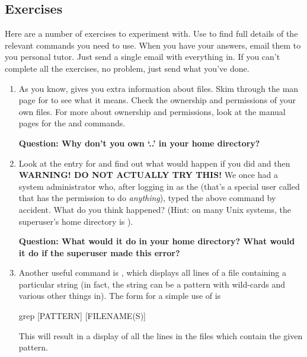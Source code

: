 \subsection{Exercises}

Here are a number of exercises to experiment with. Use 
to find full details of the relevant commands you need to use. When you
have your answers, email them to you personal tutor. Just send a
single email with everything in. If you can't complete all the
exercises, no problem, just send what you've done.

%
\begin{enumerate}
%
%
\item As you know,  gives you extra information
 about files. Skim through the man page for  to see what
 it means. Check the ownership and permissions of your
 own files. For more
 about ownership and permissions, look at the manual pages for the
  and  commands.

 \textbf{Question: Why don't you own `..'  in your home directory?}

%
\item Look at the  entry for   and find out
  what would happen if you did  and then
  \\
  \textbf{WARNING! DO NOT ACTUALLY TRY THIS!}  We once had a system administrator who, after
  logging in as the  (that's a special user called
   that has the permission to do \emph{anything}), typed
  the above command by accident. What do you think happened? (Hint: on
  many Unix systems, the superuser's home directory is \ttout{/}).

\textbf{Question: What would it do in your home directory? What would it do if the
  superuser made this error?}

\item Another useful command is , which displays all
  lines of a file containing a particular string (in fact, the
  string can be a pattern with wild-cards and various other things in).
  The form for a simple use of  is
\begin{ttoutenv}
  grep [PATTERN] [FILENAME(S)]
\end{ttoutenv}
%
This will result in a display of all the lines in the files which
contain the given pattern.


\end{enumerate}
